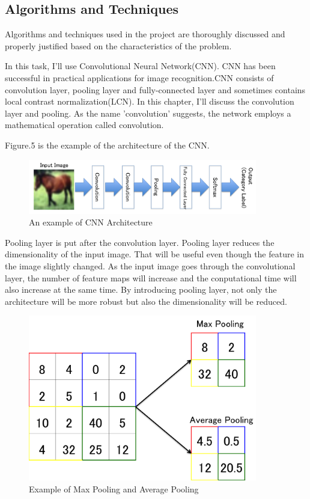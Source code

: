 \documentclass[a4paper,10pt,fleqn]{article}
\begin{document}
\subsection{Algorithms and Techniques}
Algorithms and techniques used in the project are thoroughly discussed and properly justified based on the characteristics of the problem.

In this task, I'll use Convolutional Neural Network(CNN). CNN has been successful in  practical applications for image recognition.CNN consists of convolution layer, pooling layer and fully-connected layer and sometimes contains local contrast normalization(LCN). In this chapter, I'll discuss the convolution layer and pooling.
As the name 'convolution' suggests, the network employs a mathematical operation called convolution. 

Figure.5 is the example of the architecture of the CNN.
\begin{figure}[htbp]

	\begin{center}
	\includegraphics[width=10cm]{picture/Architecture_of_CNN.png}
	\caption{An example of CNN Architecture}
	\end{center}
	\label{fig:five}

\end{figure}

Pooling layer is put after the convolution layer. Pooling layer reduces the dimensionality of the input image. That will be useful even though the feature in the image slightly changed. As the input image goes through the convolutional layer, the number of feature maps will increase and the conputational time will also increase at the same time. By introducing pooling layer, not only the architecture will be more robust but also the dimensionality will be reduced.

\begin{figure}[htbp]

	\begin{center}
	\includegraphics[width=10cm]{picture/Pooling.png}
	\caption{Example of Max Pooling and Average Pooling}
	\end{center}
	\label{fig:six}

\end{figure}
\end{document}
